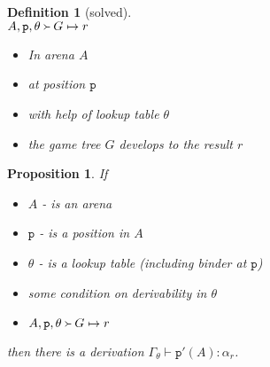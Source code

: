 \documentclass[10pt,a4paper]{article}
\theoremstyle{plain}%
\newtheorem{definition}[theorem]{Definition}
\newtheorem{proposition}[theorem]{Proposition}
\begin{document}
%
%

\newcommand{\p}{\mathtt{p}\xspace}

\begin{definition}[solved]~\\

  $A, \p, \theta \Yright G\mapsto r$
  \begin{itemize}
  \item In arena $A$
  \item at position $\p$
  \item with help of lookup table $\theta$
  \item the game tree $G$ develops to the result $r$
  \end{itemize}
\end{definition}

\begin{proposition}
  If
  \begin{itemize}
  \item $A$ - is an arena
  \item $\p$ - is a position in $A$
  \item $\theta$ - is a lookup table (including binder at $\p$)
  \item \emph{some condition on derivability in $\theta$}
  \item $A, \p, \theta \Yright G\mapsto r$
  \end{itemize}
  then there is a derivation $\Gamma_\theta\vdash \p'(A) : \alpha_r$.
\end{proposition}
\end{document}

